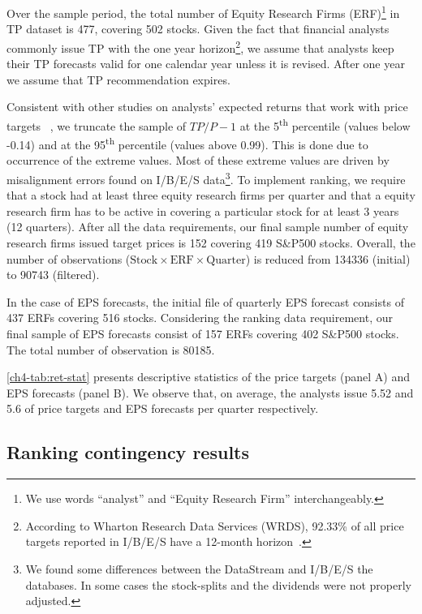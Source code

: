 \documentclass[a4paper,twoside,12pt,openright,notitlepage]{report}\usepackage[]{graphicx}\usepackage[]{color}
\begin{document}
Over the sample period, the total number of Equity Research Firms (ERF)\footnote{We use words ``analyst'' and ``Equity Research Firm'' interchangeably.} in TP dataset is 477, covering 502  stocks. Given the fact that financial analysts commonly issue TP with the one year horizon\footnote{According to Wharton Research Data Services (WRDS), 92.33\% of all price targets reported in I/B/E/S have a 12-month horizon~\citep{glushkov2009}.}, we assume that analysts keep their TP forecasts valid for one calendar year unless it is revised. After one year we assume that TP recommendation expires.

Consistent with other studies on analysts' expected returns that work with price targets ~\citep{bradshaw2002,brav2003,da2011}, we truncate the sample of $TP/P-1$ at the 5\textsuperscript{th} percentile (values below -0.14) and at the 95\textsuperscript{th} percentile (values above 0.99). This is done due to occurrence of the extreme values. Most of these extreme values are driven by misalignment errors found on I/B/E/S data\footnote{We found some differences between the  DataStream and I/B/E/S the databases. In some cases the stock-splits and the dividends were not properly adjusted.}. To implement ranking, we require that a stock had at least three equity research firms per quarter and that a equity research firm has to be active in covering a particular stock for at least 3 years (12 quarters). After all the  data requirements, our final sample number of equity research firms issued target prices is 152 covering 419 S\&P500 stocks. Overall, the number of observations ($\mathrm{Stock} \times \mathrm{ERF} \times  \mathrm{Quarter}$) is reduced  from 134336 (initial) to 90743 (filtered).

In the case of EPS forecasts, the initial file of quarterly EPS forecast consists of 437 ERFs covering 516 stocks. Considering the ranking data requirement, our final sample of EPS forecasts consist of  157 ERFs covering 402 S\&P500 stocks. The total number of observation is 80185.

\ref{ch4-tab:ret-stat} presents descriptive statistics of the price targets (panel A) and EPS forecasts (panel B). We observe that, on average, the analysts issue 5.52 and 5.6 of price targets and EPS forecasts per quarter respectively.

\subsection{Ranking contingency results}
\label{ch4-tab:rank-contin}
\end{document}

